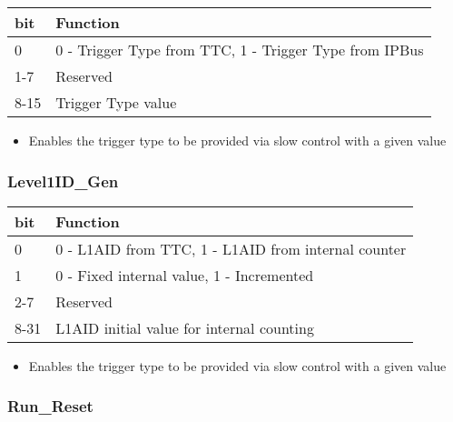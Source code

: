 \begin {table}[H]
\begin{center}
\begin{tabular}{|l|l|}
\hline
\textbf{bit} & \textbf{Function} \\
\hline
0 & 0 - Trigger Type from TTC, 1 - Trigger Type from IPBus \\
\hline
1-7 & Reserved  \\
\hline
8-15 & Trigger Type value \\
\hline
\end{tabular}
\end{center}
\end{table}


\begin{itemize}
\item Enables the trigger type to be provided via slow control with a given value
\end{itemize}



\subsubsection{Level1ID\_Gen}

\begin {table}[H]
\begin{center}
\begin{tabular}{|l|l|}
\hline
\textbf{bit} & \textbf{Function} \\
\hline
0 & 0 - L1AID from TTC, 1 - L1AID from internal counter \\
\hline
1 & 0 - Fixed internal value, 1 - Incremented \\
\hline
2-7 & Reserved \\
\hline
8-31 & L1AID initial value for internal counting  \\
\hline
\end{tabular}
\end{center}
\end{table}


\begin{itemize}
\item Enables the trigger type to be provided via slow control with a given value
\end{itemize}




\subsubsection{Run\_Reset}


